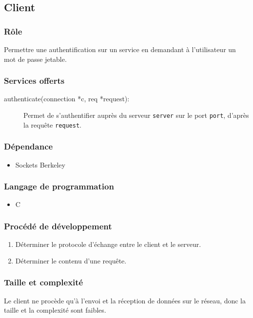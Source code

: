 \documentclass{"../../res/univ-projet"}
\begin{document}
\subsection{Client}
    \subsubsection{Rôle}
        Permettre une authentification sur un service en demandant à
    l'utilisateur un mot de passe jetable.

    \subsubsection{Services offerts}
    \begin{description}
        \item[authenticate(connection *c, req *request):] Permet
            de s'authentifier auprès du serveur \verb?server? sur 
            le port \verb?port?, d'après la requête \verb?request?.
    \end{description}

    \subsubsection{Dépendance}
    \begin{itemize}
        \item Sockets Berkeley
    \end{itemize}

    \subsubsection{Langage de programmation}
    \begin{itemize}
        \item C
    \end{itemize}

    \subsubsection{Procédé de développement}
    \begin{enumerate}
        \item Déterminer le protocole d'échange entre le client et le
            serveur.
        \item Déterminer le contenu d'une requête.
    \end{enumerate}

    \subsubsection{Taille et complexité}
        Le client ne procède qu'à l'envoi et la réception de données sur le
        réseau, donc la taille et la complexité sont faibles.
\end{document}
